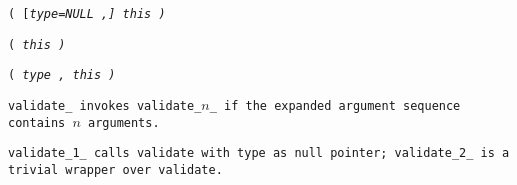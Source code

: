 
\s\s\s\tt{(} [\it{type}\tt{=NULL ,}] \it{this} \tt{)}

\s\tt{(} \it{this} \tt{)}

\s\tt{(} \it{type} \tt{,} \it{this} \tt{)}


\tt{validate_} invokes \tt{validate_}$n$\_ if the
expanded argument sequence contains  $n$ arguments.

\tt{validate_1_} calls \tt{validate} with \tt{type} as null pointer;
\tt{validate_2_} is a trivial wrapper over \tt{validate}.

